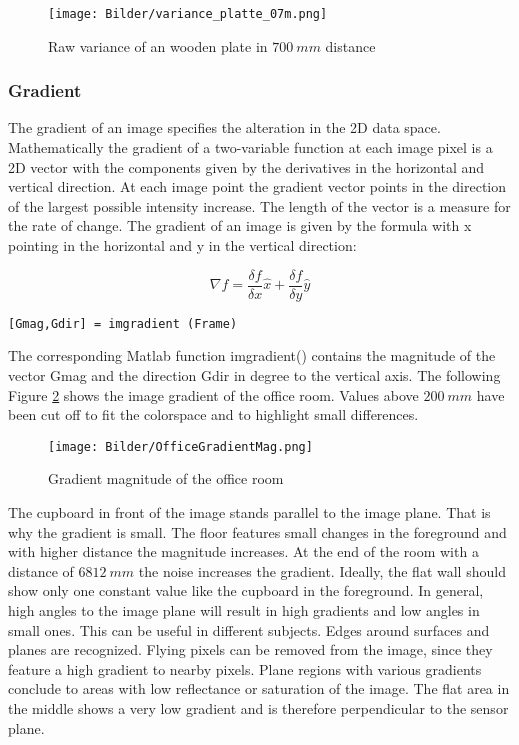 \begin{figure}[!h]
	\centering
	\texttt{[image: Bilder/variance\_platte\_07m.png]}
	\caption{Raw variance of an wooden plate in $700~mm$ distance}
	\label{fig:variance_raw}
\end{figure}

\newpage

\subsubsection{Gradient}
The gradient of an image specifies the alteration in the 2D data space. Mathematically the gradient of a two-variable function at each image pixel is a 2D vector with the components given by the derivatives in the horizontal and vertical direction. At each image point the gradient vector points in the direction of the largest possible intensity increase. The length of the vector is a measure for the rate of change. The gradient of an image is given by the formula with x pointing in the horizontal and y in the vertical direction:

\begin{equation}\label{eq:grad}
\nabla f = \frac{\delta f}{\delta x} \hat{x} + \frac{\delta f}{\delta y} \hat{y}
\end{equation}
\medskip
\begin{lstlisting}
[Gmag,Gdir] = imgradient (Frame)
\end{lstlisting}
\medskip

The corresponding Matlab function imgradient() contains the magnitude of the vector Gmag and  the direction Gdir in degree to the vertical axis. The following Figure \ref{fig:gradient_magnitude} shows the image gradient of the office room. Values above $200~mm$ have been cut off to fit the colorspace and to highlight small differences.

\begin{figure}[!h]
	\centering
	\texttt{[image: Bilder/OfficeGradientMag.png]}
	\caption{Gradient magnitude of the office room}
	\label{fig:gradient_magnitude}
\end{figure}

The cupboard in front of the image stands parallel to the image plane. That is why the gradient is small. The floor features small changes in the foreground and with higher distance the magnitude increases. At the end of the room with a distance of $6812~mm$ the noise increases the gradient. Ideally, the flat wall should show only one constant value like the cupboard in the foreground. In general, high angles to the image plane will result in high gradients and low angles in small ones. This can be useful in different subjects. Edges around surfaces and planes are recognized. Flying pixels can be removed from the image, since they feature a high gradient to nearby pixels. Plane regions with various gradients conclude to areas with low reflectance or saturation of the image. The flat area in the middle shows a very low gradient and is therefore perpendicular to the sensor plane. 

